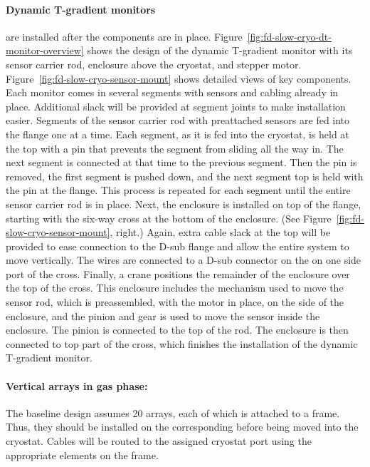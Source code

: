 \paragraph{Dynamic T-gradient monitors} %
are installed
after the  components are in place.
Figure~\ref{fig:fd-slow-cryo-dt-monitor-overview} shows the
design of the dynamic T-gradient monitor with its sensor carrier rod,
enclosure above the cryostat, and stepper motor. 
 Figure~\ref{fig:fd-slow-cryo-sensor-mount} shows detailed views of key
components.  Each monitor %
comes in several segments with sensors
and cabling already in place. Additional slack will be provided at
segment joints to make installation easier. Segments of the sensor
carrier rod with preattached sensors %
are fed into the flange one
at a time. Each segment, as it is fed into the %
cryostat, is %
held at the top with a pin that prevents the segment from sliding all
the way in. %
The next segment %
is connected at that
time to the previous segment. Then the pin %
is removed, the first
segment %
is pushed down, and the next segment top %
is held
with the pin at the flange. This process %
is repeated for each
segment %
until the entire sensor carrier rod is in
place.  Next, the enclosure %
is installed on top of the flange,
starting with the six-way cross at the bottom of the enclosure.  (See
 Figure~\ref{fig:fd-slow-cryo-sensor-mount}, right.)  Again, extra cable
slack at the top will be provided to ease connection to the D-sub
flange and allow the entire system to move vertically.  The wires
are connected to a D-sub connector on the \fdth on one side port
of the cross. Finally, a crane %
positions the remainder
of the enclosure over the top of the cross.  This enclosure includes
the mechanism used to move the sensor rod, which %
is preassembled,
with the motor in place, on the side of the enclosure, and the pinion
and gear is used to move the sensor inside the enclosure.  The pinion
is connected to the top of the rod. The enclosure is then %
connected to top part of the cross, which finishes the installation of
the dynamic T-gradient monitor.


\paragraph{Vertical arrays in gas phase:} The baseline design assumes 20 arrays, each of which is attached to a  frame. Thus, they should be installed on the corresponding  before being moved into the cryostat. Cables will be routed to the assigned cryostat port using the appropriate elements on the  frame. 

